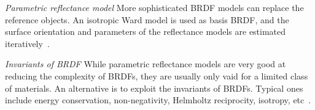 \textit{Parametric reflectance model} 
More sophisticated BRDF models can replace the reference objects. An isotropic Ward model is used as basis BRDF, and the surface orientation and parameters of the reflectance models are estimated iteratively~\cite{goldman2010shape}.

\textit{Invariants of BRDF} 
While parametric reflectance models are very good at reducing the complexity of BRDFs, they are usually only vaid for a limited class of materials. An alternative is to exploit the invariants of BRDFs. Typical ones include energy conservation, non-negativity, Helmholtz reciprocity, isotropy, etc~\cite{zickler2002helmholtz,alldrin2007toward}.



